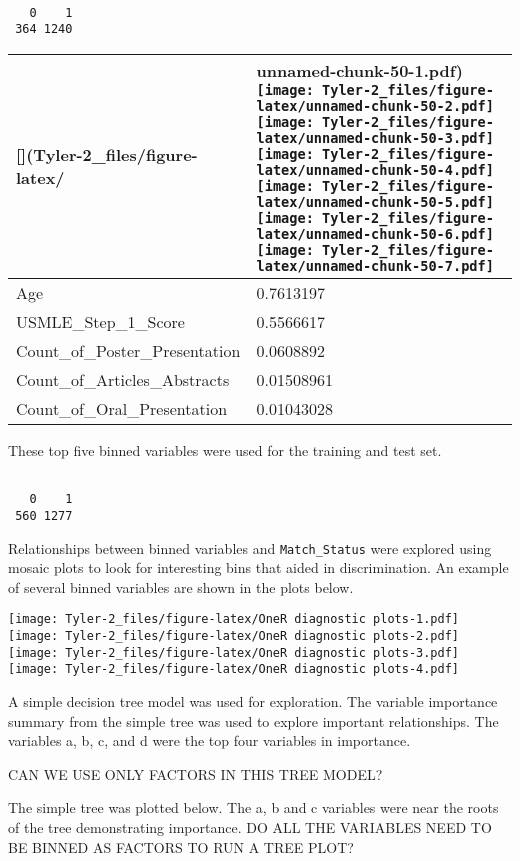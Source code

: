 \documentclass[12pt,]{article}
\begin{document}
\begin{verbatim}

   0    1 
 364 1240 
\end{verbatim}

\begin{longtable}[]{@{}ll@{}}
\toprule
{[}{]}(Tyler-2\_files/figure-latex/ & unnamed-chunk-50-1.pdf)
\texttt{[image: Tyler-2\_files/figure-latex/unnamed-chunk-50-2.pdf]}
\texttt{[image: Tyler-2\_files/figure-latex/unnamed-chunk-50-3.pdf]}
\texttt{[image: Tyler-2\_files/figure-latex/unnamed-chunk-50-4.pdf]}
\texttt{[image: Tyler-2\_files/figure-latex/unnamed-chunk-50-5.pdf]}
\texttt{[image: Tyler-2\_files/figure-latex/unnamed-chunk-50-6.pdf]}
\texttt{[image: Tyler-2\_files/figure-latex/unnamed-chunk-50-7.pdf]}\tabularnewline
\midrule
\endhead
Age & 0.7613197\tabularnewline
USMLE\_Step\_1\_Score & 0.5566617\tabularnewline
Count\_of\_Poster\_Presentation & 0.0608892\tabularnewline
Count\_of\_Articles\_Abstracts & 0.01508961\tabularnewline
Count\_of\_Oral\_Presentation & 0.01043028\tabularnewline
\bottomrule
\end{longtable}

These top five binned variables were used for the training and test set.

\begin{verbatim}

   0    1 
 560 1277 
\end{verbatim}

Relationships between binned variables and \texttt{Match\_Status} were
explored using mosaic plots to look for interesting bins that aided in
discrimination. An example of several binned variables are shown in the
plots below.

\texttt{[image: Tyler-2\_files/figure-latex/OneR diagnostic plots-1.pdf]}
\texttt{[image: Tyler-2\_files/figure-latex/OneR diagnostic plots-2.pdf]}
\texttt{[image: Tyler-2\_files/figure-latex/OneR diagnostic plots-3.pdf]}
\texttt{[image: Tyler-2\_files/figure-latex/OneR diagnostic plots-4.pdf]}

A simple decision tree model was used for exploration. The variable
importance summary from the simple tree was used to explore important
relationships. The variables a, b, c, and d were the top four variables
in importance.

CAN WE USE ONLY FACTORS IN THIS TREE MODEL?

The simple tree was plotted below. The a, b and c variables were near
the roots of the tree demonstrating importance. DO ALL THE VARIABLES
NEED TO BE BINNED AS FACTORS TO RUN A TREE PLOT?
\end{document}
